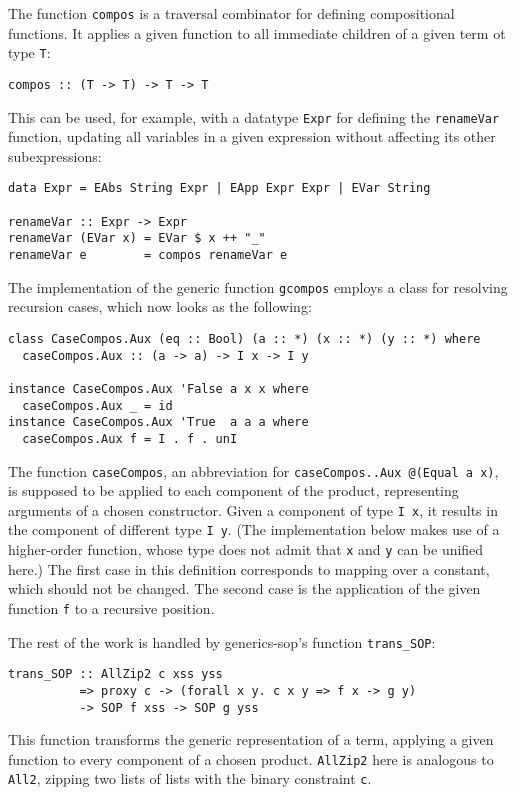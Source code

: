 \documentclass[runningheads]{llncs}
\newcommand{\K}[1]{\lstinline[style=fancy]{#1}}
\begin{document}
The function \K{compos} is a traversal combinator for defining compositional functions. It applies a given function to all immediate children of a given term ot type \K{T}:
\begin{lstlisting}[style=fancy]
compos :: (T -> T) -> T -> T
\end{lstlisting}
This can be used, for example, with a datatype \K{Expr} for defining the \K{renameVar} function, updating all variables in a given expression without affecting its other subexpressions:
\begin{lstlisting}[style=fancy]
data Expr = EAbs String Expr | EApp Expr Expr | EVar String

renameVar :: Expr -> Expr
renameVar (EVar x) = EVar $ x ++ "_"
renameVar e        = compos renameVar e
\end{lstlisting}

The implementation of the generic function \K{gcompos} employs a class for resolving recursion cases, which now looks as the following:
\begin{lstlisting}[style=fancy]
class CaseCompos.Aux (eq :: Bool) (a :: *) (x :: *) (y :: *) where
  caseCompos.Aux :: (a -> a) -> I x -> I y

instance CaseCompos.Aux 'False a x x where
  caseCompos.Aux _ = id
instance CaseCompos.Aux 'True  a a a where
  caseCompos.Aux f = I . f . unI
\end{lstlisting}
The function \K{caseCompos}, an abbreviation for \K{caseCompos..Aux @(Equal a x)}, is supposed to be applied to each component of the product, representing arguments of a chosen constructor. Given a component of type \K{I x}, it results in the component of different type \K{I y}. (The implementation below makes use of a higher-order function, whose type does not admit that \K{x} and \K{y} can be unified here.) The first case in this definition corresponds to mapping over a constant, which should not be changed. The second case is the application of the given function \K{f} to a recursive position.

The rest of the work is handled by \textsf{generics-sop}'s function \K{trans_SOP}:
\begin{lstlisting}[style=fancy]
trans_SOP :: AllZip2 c xss yss
          => proxy c -> (forall x y. c x y => f x -> g y)
          -> SOP f xss -> SOP g yss
\end{lstlisting}
This function transforms the generic representation of a term, applying a given function to every component of a chosen product. \K{AllZip2} here is analogous to \K{All2}, zipping two lists of lists with the binary constraint \K{c}.
\end{document}
